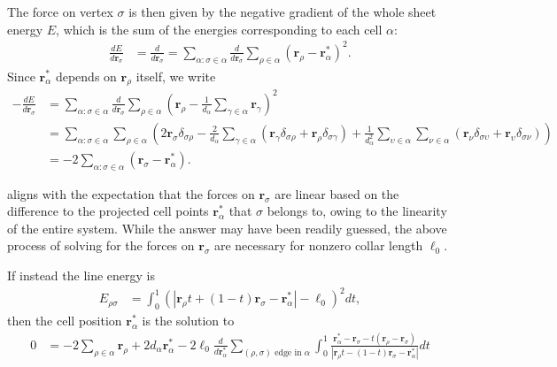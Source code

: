 The force on vertex $\sigma$ is then given by the negative gradient of the whole sheet energy $E$, which is the sum of the energies corresponding to each cell $\alpha$: 
\begin{align*}
    \frac{d E}{d\bm{r}_\sigma} &= \frac{d}{d\bm{r}_\sigma} = \sum_{\alpha:\sigma \in \alpha} \frac{d}{d\bm{r}_\sigma} \sum_{\rho \in \alpha} (\bm{r}_\rho - \bm{r}^*_\alpha)^2. 
\end{align*}
\noindent Since $\bm{r}_\alpha^*$ depends on $\bm{r}_\rho$ itself, we write
\begin{align}
	-\frac{dE}{d\bm{r}_\sigma} &= \sum_{\alpha:\sigma \in \alpha} \frac{d}{d\bm{r}_\sigma} \sum_{\rho \in \alpha} \left(\bm{r}_\rho - \frac{1}{d_\alpha} \sum_{\gamma\in\alpha}\bm{r}_\gamma\right)^2 \nonumber \\
	&= \sum_{\alpha:\sigma\in\alpha} \sum_{\rho\in\alpha}\left( 2\bm{r}_\sigma \delta_{\sigma\rho} -\frac{2}{d_\alpha} \sum_{\gamma\in\alpha}(\bm{r}_\gamma \delta_{\sigma\rho} + \bm{r}_\rho \delta_{\sigma\gamma}) + \frac{1}{d_\alpha^2} \sum_{\upsilon\in\alpha}\sum_{\nu\in\alpha} (\bm{r}_\nu \delta_{\sigma\upsilon} + \bm{r}_\upsilon \delta_{\sigma\nu}) \right) \nonumber \\
	&= -2 \sum_{\alpha: \sigma\in\alpha} (\bm{r}_\sigma - \bm{r}_\alpha^*). \label{eq:com}
\end{align}

 aligns with the expectation that the forces on $\bm{r}_\sigma$ are linear based on the difference to the projected cell points $\bm{r}_\alpha^*$ that $\sigma$ belongs to, owing to the linearity of the entire system.
While the answer may have been readily guessed, the above process of solving for the forces on $\bm{r}_\sigma$ are necessary for nonzero collar length $\ell_0$. 

If instead the line energy is 
\begin{align*}
    E_{\rho\sigma} &= \int_0^1 \left(\left|\bm{r}_\rho t + (1-t)\bm{r}_\sigma - \bm{r}_\alpha^*\right| - \ell_0 \right)^2 dt,
\end{align*}
then the cell position $\bm{r}^*_\alpha$ is the solution to
\begin{align}
	0 &= -2\sum_{\rho\in\alpha} \bm{r}_\rho + 2d_\alpha \bm{r}_\alpha^* -2\ell_0 \frac{d}{d\bm{r}_\alpha^*} \sum_{(\rho,\sigma) \text{ edge in }\alpha} \int_0^1 \frac{\bm{r}_\alpha^* - \bm{r}_\sigma - t (\bm{r}_\rho - \bm{r}_\sigma)}{| \bm{r}_\rho t - (1-t) \bm{r}_\sigma - \bm{r}_\alpha^*|} dt \label{eq:com_full}
\end{align}

